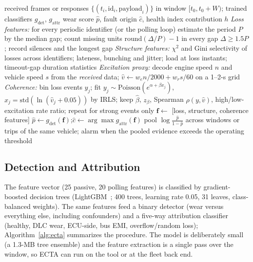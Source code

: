 \begin{algorithm}[!t]
\caption{ECTA for One Telemetry Window}
\label{alg:ecta}
\begin{algorithmic}[1]
\REQUIRE received frames or responses $\{(t_i,\mathrm{id}_i,\mathrm{payload}_i)\}$ in window $[t_0,t_0+W)$; trained classifiers $g_{\mathrm{det}}$, $g_{\mathrm{attr}}$
\ENSURE wear score $\hat p$, fault origin $\hat c$, health index contribution $h$
\STATE \textit{Loss features:} for every periodic identifier (or the polling loop) estimate the period $P$ by the median gap; count missing units $\mathrm{round}(\Delta/P)-1$ in every gap $\Delta \ge 1.5P$; record silences and the longest gap
\STATE \textit{Structure features:} $\chi^2$ and Gini selectivity of losses across identifiers; lateness, bunching and jitter; load at loss instants; timeout-gap duration statistics
\STATE \textit{Excitation proxy:} decode engine speed $n$ and vehicle speed $s$ from the \emph{received} data; $\hat v \leftarrow w_e n/2000 + w_r s/60$ on a 1--2-s grid
\STATE \textit{Coherence:} bin loss events $y_j$; fit $y_j\sim\mathrm{Poisson}(e^{\alpha+\beta x_j})$, $x_j=\mathrm{std}(\ln(\hat v_j+0.05))$ by IRLS; keep $\hat\beta$, $z_\beta$, Spearman $\rho(y,\hat v)$, high/low-excitation rate ratio; repeat for strong events only
\STATE $\mathbf f \leftarrow$ [loss, structure, coherence features]
\STATE $\hat p \leftarrow g_{\mathrm{det}}(\mathbf f)$;\quad $\hat c \leftarrow \arg\max g_{\mathrm{attr}}(\mathbf f)$
\STATE pool $\log\frac{\hat p}{1-\hat p}$ across windows or trips of the same vehicle; alarm when the pooled evidence exceeds the operating threshold
\end{algorithmic}
\end{algorithm}

\subsection{Detection and Attribution}
The feature vector (25 passive, 20 polling features) is classified by
gradient-boosted decision trees (LightGBM~\cite{lightgbm}; 400 trees,
learning rate 0.05, 31 leaves, class-balanced weights). The same features
feed a binary detector (wear versus everything else, including
confounders) and a five-way attribution classifier (healthy, DLC wear,
ECU-side, bus EMI, overflow/random loss); Algorithm~\ref{alg:ecta} summarizes
the procedure. The model is deliberately
small (a 1.3-MB tree ensemble) and the feature extraction is a single pass
over the window, so ECTA can run on the tool or at the fleet back end.


